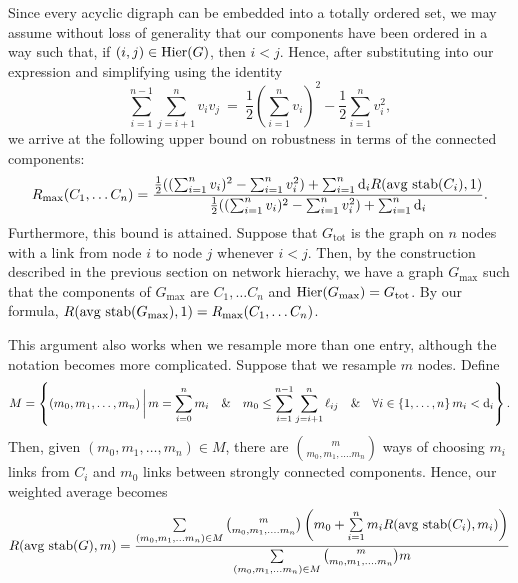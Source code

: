 Since every acyclic digraph can be embedded into a totally ordered
set, we may assume without loss of generality that our components have
been ordered in a way such that, if $(i,j) \in \mathrm{Hier}(G)$, then $i <
j$.  Hence, after substituting into our expression and simplifying
using the identity
$$\sum_{i=1}^{n-1}\sum_{j=i+1}^{n}v_i
v_j~=~\frac{1}{2} \left( \sum_{i=1}^{n} v_i \right)^2-\frac{1}{2} \sum_{i=1}^{n}
v_i^2,$$
we arrive at the following upper bound on robustness in terms
of the connected components:
\begin{align} \label{eq:sccmaxrobustness}
R_{\mathrm{max}}(C_1, \ldots C_n) =
\frac{\frac{1}{2} ((\sum_{i=1}^n v_i)^2 - \sum_{i=1}^n v_i^2) +
                    \sum_{i=1}^n \mathrm{d}_i R(\hbox{avg stab}(C_i),1)}
     {\frac{1}{2} ((\sum_{i=1}^n v_i)^2 - \sum_{i=1}^n v_i^2) +
                    \sum_{i=1}^n \mathrm{d}_i}.
\end{align}
Furthermore, this bound is attained.  Suppose that $G_{\mathrm{tot}}$
is the graph on $n$ nodes with a link from node $i$ to node $j$
whenever $i < j$.  Then, by the construction described in the previous
section on network hierachy, we have a graph $G_{\mathrm{max}}$ such
that the components of $G_{\mathrm{max}}$ are $C_1, \ldots C_n$ and
$\mathrm{Hier} (G_{\mathrm{max}}) = G_{\mathrm{tot}}$.  By our formula,
$R(\hbox{avg stab} (G_{\mathrm{max}}), 1) = R_{\mathrm{max}}(C_1, \ldots C_n)$.

This argument also works when we resample more than one entry,
although the notation becomes more complicated.  Suppose that we
resample $m$ nodes.  Define
\begin{equation*}
M = \left\{(m_0, m_1, \ldots, m_n) \,\bigg|\,
m = \sum_{i=0}^n m_i \quad\&\quad
m_0 \le \sum_{i=1}^{n-1} \sum_{j=i+1}^n \ell_{ij} \quad\&\quad
\forall i \in \{1, \ldots, n\} \, m_i < \mathrm{d}_i \right\}.
\end{equation*}
Then, given $(m_0, m_1, \ldots, m_n) \in M$, there are ${m \choose
m_0, m_1, \ldots. m_n}$ ways of choosing $m_i$ links from $C_i$ and
$m_0$ links between strongly connected components.  Hence, our
weighted average becomes
\begin{equation}
R(\hbox{avg stab} (G), m) =
\frac{\sum\limits_{(m_0, m_1, \ldots m_n) \in M}
      {m \choose m_0, m_1, \ldots. m_n}
      \left(m_0 + \sum\limits_{i=1}^n m_i R(\hbox{avg stab} (C_i), m_i) \right)}
     {\sum\limits_{(m_0, m_1, \ldots m_n) \in M}
      {m \choose m_0, m_1, \ldots. m_n} m}
\end{equation}

